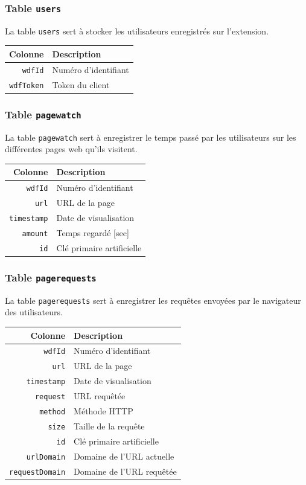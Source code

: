 		\subsubsection{Table \texttt{users}}\label{table-users}
			La table \texttt{users} sert à stocker les utilisateurs enregistrés sur l'extension.

			\begin{tabular}{rl}
				\textbf{Colonne} & \textbf{Description} \\
				\hline
			    \texttt{wdfId}    & Numéro d'identifiant \\
				\texttt{wdfToken} & Token du client \\
			\end{tabular}
		
		\subsubsection{Table \texttt{pagewatch}}\label{table-pagewatch}
			La table \texttt{pagewatch} sert à enregistrer le temps passé par les utilisateurs sur les différentes pages web qu'ils visitent.

			\begin{tabular}{rl}
				\textbf{Colonne} & \textbf{Description} \\
				\hline
			    \texttt{wdfId}    & Numéro d'identifiant \\
				\texttt{url}  & URL de la page \\
				\texttt{timestamp} & Date de visualisation \\
				\texttt{amount} & Temps regardé [sec] \\
				\texttt{id} & Clé primaire artificielle \\
			\end{tabular}
		
		\subsubsection{Table \texttt{pagerequests}}\label{table-pagerequests}
			La table \texttt{pagerequests} sert à enregistrer les requêtes envoyées par le navigateur des utilisateurs.

			\begin{tabular}{rl}
				\textbf{Colonne} & \textbf{Description} \\
				\hline
			    \texttt{wdfId}    & Numéro d'identifiant \\
				\texttt{url}  & URL de la page \\
				\texttt{timestamp} & Date de visualisation \\
				\texttt{request} & URL requêtée \\
				\texttt{method} & Méthode HTTP \\
				\texttt{size} & Taille de la requête \\
				\texttt{id} & Clé primaire artificielle \\
				\texttt{urlDomain} & Domaine de l'URL actuelle \\
				\texttt{requestDomain} & Domaine de l'URL requêtée\\
			\end{tabular}
		
